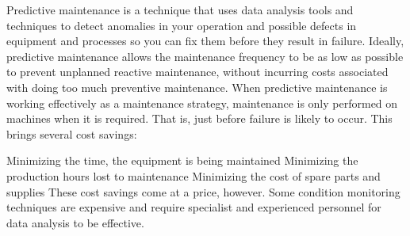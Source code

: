 \label{sec:introduction}
Predictive maintenance is a technique that uses data analysis tools and techniques to detect anomalies in your operation and possible defects in equipment and processes so you can fix them before they result in failure.
Ideally, predictive maintenance allows the maintenance frequency to be as low as possible to prevent unplanned reactive maintenance, without incurring costs associated with doing too much preventive maintenance.
When predictive maintenance is working effectively as a maintenance strategy, maintenance is only performed on machines when it is required. That is, just before failure is likely to occur. This brings several cost savings:

Minimizing the time, the equipment is being maintained
Minimizing the production hours lost to maintenance
Minimizing the cost of spare parts and supplies
These cost savings come at a price, however. Some condition monitoring techniques are expensive and require specialist and experienced personnel for data analysis to be effective.
